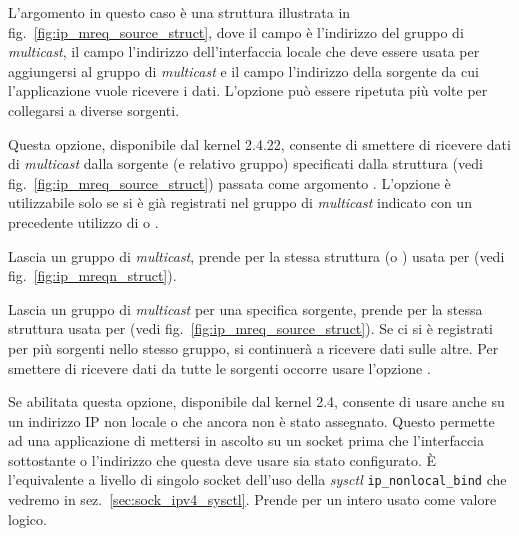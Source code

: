\begin{basedescript}{\desclabelwidth{2.0cm}\desclabelstyle{\nextlinelabel}}
L'argomento  in questo caso è una struttura
 illustrata in fig.~\ref{fig:ip_mreq_source_struct},
dove il campo  è l'indirizzo del gruppo di
\textit{multicast}, il campo  l'indirizzo dell'interfaccia
locale che deve essere usata per aggiungersi al gruppo di \textit{multicast} e
il campo  l'indirizzo della sorgente da cui
l'applicazione vuole ricevere i dati. L'opzione può essere ripetuta più volte
per collegarsi a diverse sorgenti.

\item[\constd{IP\_BLOCK\_SOURCE}] Questa opzione, disponibile dal kernel
  2.4.22, consente di smettere di ricevere dati di \textit{multicast} dalla
  sorgente (e relativo gruppo) specificati dalla struttura
   (vedi fig.~\ref{fig:ip_mreq_source_struct})
  passata come argomento . L'opzione è utilizzabile solo se si è
  già registrati nel gruppo di \textit{multicast} indicato con un precedente
  utilizzo di  o
  .

\item[\constd{IP\_DROP\_MEMBERSHIP}] Lascia un gruppo di \textit{multicast},
  prende per  la stessa struttura  (o
  ) usata per  (vedi
  fig.~\ref{fig:ip_mreqn_struct}).

\item[\constd{IP\_DROP\_SOURCE\_MEMBERSHIP}] Lascia un gruppo di
  \textit{multicast} per una specifica sorgente, prende per  la
  stessa struttura  usata per
   (vedi
  fig.~\ref{fig:ip_mreq_source_struct}). Se ci si è registrati per più
  sorgenti nello stesso gruppo, si continuerà a ricevere dati sulle altre. Per
  smettere di ricevere dati da tutte le sorgenti occorre usare l'opzione
  .

\item[\constd{IP\_FREEBIND}] Se abilitata questa opzione, disponibile dal
  kernel 2.4, consente di usare  anche su un indirizzo IP non
  locale o che ancora non è stato assegnato. Questo permette ad una
  applicazione di mettersi in ascolto su un socket prima che l'interfaccia
  sottostante o l'indirizzo che questa deve usare sia stato configurato. È
  l'equivalente a livello di singolo socket dell'uso della \textit{sysctl}
  \texttt{ip\_nonlocal\_bind} che vedremo in
  sez.~\ref{sec:sock_ipv4_sysctl}. Prende per
   un intero usato come valore logico.


\end{basedescript}
